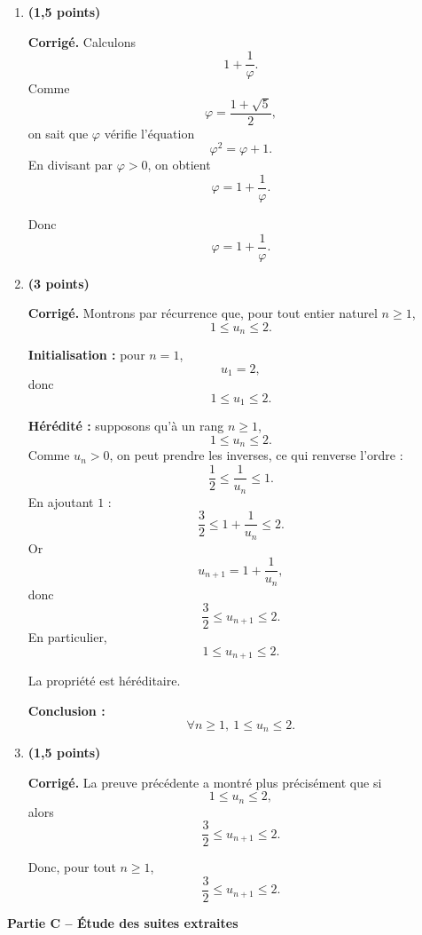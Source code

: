 \documentclass[11pt,a4paper]{article}
\newcommand{\bareme}[1]{\hfill{\color{blue!70!black}\textbf{(#1 points)}}}
\newcommand{\corr}{\noindent\textcolor{blue!70!black}{\textbf{Corrigé. }}}
\begin{document}
\begin{enumerate}[label=\textbf{B.\arabic*.}, leftmargin=0.9cm]

\item \bareme{1,5}

\corr Calculons
\[
1+\frac1\varphi.
\]
Comme
\[
\varphi=\frac{1+\sqrt5}{2},
\]
on sait que $\varphi$ vérifie l’équation
\[
\varphi^2=\varphi+1.
\]
En divisant par $\varphi>0$, on obtient
\[
\varphi=1+\frac1\varphi.
\]

Donc
\[
\boxed{\varphi=1+\frac1\varphi.}
\]

\item \bareme{3}

\corr Montrons par récurrence que, pour tout entier naturel $n\geq 1$,
\[
1\leq u_n\leq 2.
\]

\textbf{Initialisation :} pour $n=1$,
\[
u_1=2,
\]
donc
\[
1\leq u_1\leq 2.
\]

\textbf{Hérédité :} supposons qu’à un rang $n\geq 1$,
\[
1\leq u_n\leq 2.
\]
Comme $u_n>0$, on peut prendre les inverses, ce qui renverse l’ordre :
\[
\frac12\leq \frac1{u_n}\leq 1.
\]
En ajoutant $1$ :
\[
\frac32\leq 1+\frac1{u_n}\leq 2.
\]
Or
\[
u_{n+1}=1+\frac1{u_n},
\]
donc
\[
\frac32\leq u_{n+1}\leq 2.
\]
En particulier,
\[
1\leq u_{n+1}\leq 2.
\]

La propriété est héréditaire.

\textbf{Conclusion :}
\[
\boxed{\forall n\geq 1,\ 1\leq u_n\leq 2.}
\]

\item \bareme{1,5}

\corr La preuve précédente a montré plus précisément que si
\[
1\leq u_n\leq 2,
\]
alors
\[
\frac32\leq u_{n+1}\leq 2.
\]

Donc, pour tout $n\geq 1$,
\[
\boxed{\frac32\leq u_{n+1}\leq 2.}
\]

\end{enumerate}

\medskip

\textbf{Partie C -- Étude des suites extraites}
\end{document}

